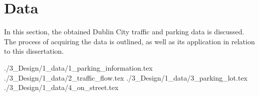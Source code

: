 \section{Data}\label{sec:design_data}
In this section, the obtained Dublin City traffic and parking data is discussed. The process of acquiring the data is outlined, as well as its application in relation to this dissertation.

{./3_Design/1_data/1_parking_information.tex}
{./3_Design/1_data/2_traffic_flow.tex}
{./3_Design/1_data/3_parking_lot.tex}
{./3_Design/1_data/4_on_street.tex}